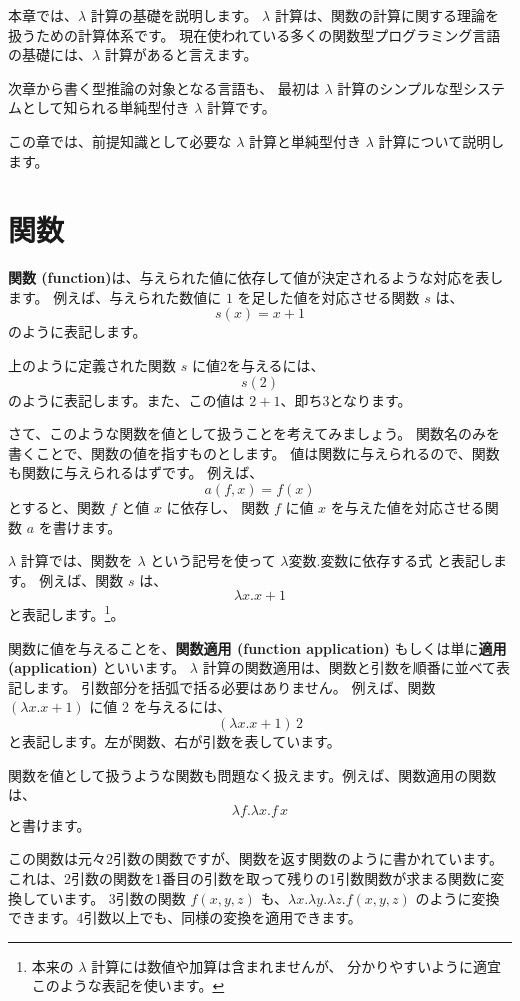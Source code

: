 
本章では、$\lambda$ 計算の基礎を説明します。
$\lambda$ 計算は、関数の計算に関する理論を扱うための計算体系です。
現在使われている多くの関数型プログラミング言語の基礎には、$\lambda$ 計算があると言えます。

次章から書く型推論の対象となる言語も、
最初は $\lambda$ 計算のシンプルな型システムとして知られる単純型付き $\lambda$ 計算です。

この章では、前提知識として必要な $\lambda$ 計算と単純型付き $\lambda$ 計算について説明します。

\section{関数}

\textbf{関数 (function)}は、与えられた値に依存して値が決定されるような対応を表します。
例えば、与えられた数値に $1$ を足した値を対応させる関数 $s$ は、
\[
  s(x) = x+1
\]
のように表記します。

上のように定義された関数 $s$ に値$2$を与えるには、
\[
  s(2)
\]
のように表記します。また、この値は $2+1$、即ち$3$となります。

さて、このような関数を値として扱うことを考えてみましょう。
関数名のみを書くことで、関数の値を指すものとします。
値は関数に与えられるので、関数も関数に与えられるはずです。
例えば、
\[
  a(f, x) = f(x)
\]
とすると、関数 $f$ と値 $x$ に依存し、
関数 $f$ に値 $x$ を与えた値を対応させる関数 $a$ を書けます。

$\lambda$ 計算では、関数を $\lambda$ という記号を使って
$\lambda \text{変数} . \text{変数に依存する式}$ と表記します。
例えば、関数 $s$ は、
\[
  \lambda x . x + 1
\]
と表記します。\footnote{本来の $\lambda$ 計算には数値や加算は含まれませんが、
分かりやすいように適宜このような表記を使います。}。

関数に値を与えることを、\textbf{関数適用 (function application)}
もしくは単に\textbf{適用 (application)} といいます。
$\lambda$ 計算の関数適用は、関数と引数を順番に並べて表記します。
引数部分を括弧で括る必要はありません。
例えば、関数 $(\lambda x . x + 1)$ に値 $2$ を与えるには、
\[
  (\lambda x . x + 1) \, 2
\]
と表記します。左が関数、右が引数を表しています。

関数を値として扱うような関数も問題なく扱えます。例えば、関数適用の関数は、
\[
  \lambda f . \lambda x . f \, x
\]
と書けます。

この関数は元々2引数の関数ですが、関数を返す関数のように書かれています。
これは、2引数の関数を1番目の引数を取って残りの1引数関数が求まる関数に変換しています。
3引数の関数 $f(x, y, z)$ も、$\lambda x . \lambda y . \lambda z . f(x, y, z)$
のように変換できます。4引数以上でも、同様の変換を適用できます。

